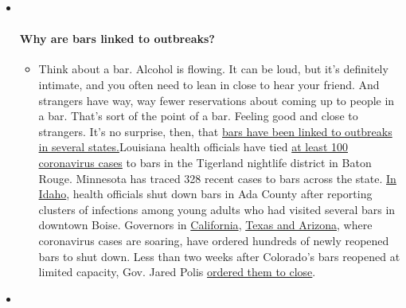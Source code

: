 \begin{itemize}
\item ~
  \hypertarget{why-are-bars-linked-to-outbreaks}{%
  \paragraph{Why are bars linked to
  outbreaks?}\label{why-are-bars-linked-to-outbreaks}}

  \begin{itemize}
  \tightlist
  \item
    Think about a bar. Alcohol is flowing. It can be loud, but it's
    definitely intimate, and you often need to lean in close to hear
    your friend. And strangers have way, way fewer reservations about
    coming up to people in a bar. That's sort of the point of a bar.
    Feeling good and close to strangers. It's no surprise, then, that
    \href{https://www.nytimes3xbfgragh.onion/2020/07/02/us/coronavirus-bars.html?action=click\&pgtype=Article\&state=default\&region=MAIN_CONTENT_3\&context=storylines_faq}{bars
    have been linked to outbreaks in several states.}Louisiana health
    officials have tied
    \href{https://www.nytimes3xbfgragh.onion/2020/06/22/us/new-coronavirus-phase.html?action=click\&pgtype=Article\&state=default\&region=MAIN_CONTENT_3\&context=storylines_faq}{at
    least 100 coronavirus cases} to bars in the Tigerland nightlife
    district in Baton Rouge. Minnesota has traced 328 recent cases to
    bars across the state.
    \href{https://www.boisestatepublicradio.org/post/bars-large-venues-close-ada-county-after-surge-coronavirus-prompts-rollback\#stream/0}{In
    Idaho}, health officials shut down bars in Ada County after
    reporting clusters of infections among young adults who had visited
    several bars in downtown Boise. Governors in
    \href{https://www.nytimes3xbfgragh.onion/2020/07/01/us/california-coronavirus-reopening.html?action=click\&pgtype=Article\&state=default\&region=MAIN_CONTENT_3\&context=storylines_faq}{California},
    \href{https://www.nytimes3xbfgragh.onion/2020/06/14/us/coronavirus-united-states.html?action=click\&pgtype=Article\&state=default\&region=MAIN_CONTENT_3\&context=storylines_faq}{Texas
    and Arizona}, where coronavirus cases are soaring, have ordered
    hundreds of newly reopened bars to shut down. Less than two weeks
    after Colorado's bars reopened at limited capacity, Gov. Jared Polis
    \href{https://www.denverpost.com/2020/06/30/colorado-bars-closed-coronavirus/}{ordered
    them to close}.
  \end{itemize}
\item ~
  \hypertarget{i-have-antibodies-am-i-now-immune}{%
}
\end{itemize}
